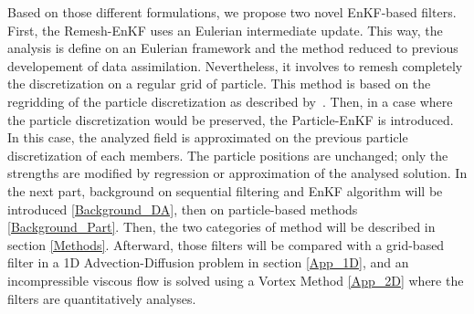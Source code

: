 Based on those different formulations, we propose two novel EnKF-based filters. First, the Remesh-EnKF uses an Eulerian intermediate update. This way, the analysis is define on an Eulerian framework and the method reduced to previous developement of data assimilation. Nevertheless, it involves to remesh completely the discretization on a regular grid of particle. This method is based on the regridding of the particle discretization as described by~\cite{cottet_multi-purpose_1999}.
Then, in a case where the particle discretization would be preserved, the Particle-EnKF is introduced. In this case, the analyzed field is approximated on the previous particle discretization of each members. The particle positions are unchanged; only the strengths are modified by regression or approximation of the analysed solution.
In the next part, background on sequential filtering and EnKF algorithm will be introduced \ref{Background_DA}, then on particle-based methods \ref{Background_Part}. Then, the two categories of method will be described in section \ref{Methods}. Afterward, those filters will be compared with a grid-based filter in a 1D Advection-Diffusion problem in section \ref{App_1D}, and an incompressible viscous flow is solved using a Vortex Method \ref{App_2D} where the filters are quantitatively analyses.






